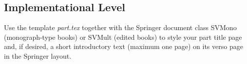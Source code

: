 % 
%
%

\begin{partbacktext}
\part{Implementational Level}
\noindent Use the template \emph{part.tex} together with the Springer document class SVMono (monograph-type books) or SVMult (edited books) to style your part title page and, if desired, a short introductory text (maximum one page) on its verso page in the Springer layout.

\end{partbacktext}